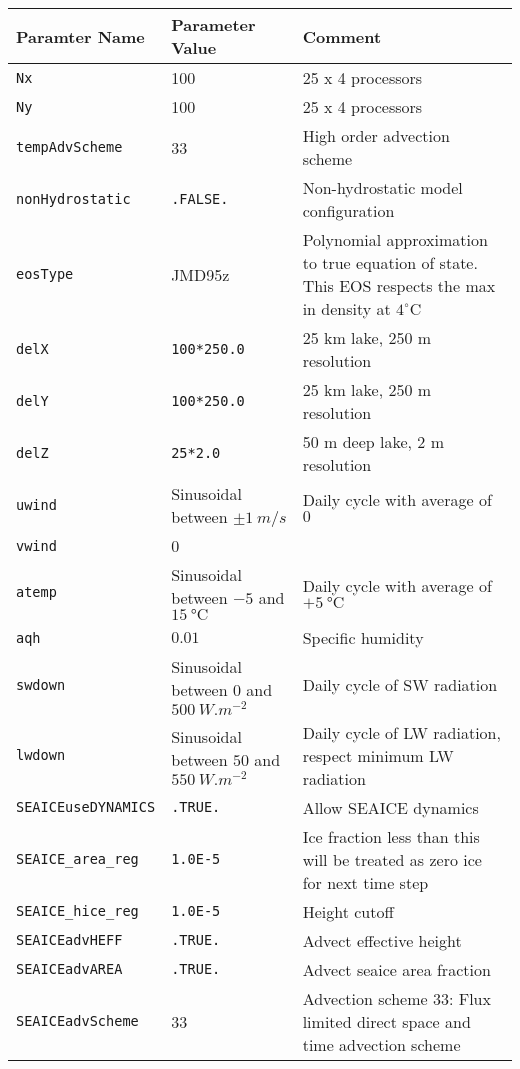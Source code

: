 \documentclass[11pt]{article}
\begin{document}
\begin{longtable}{  p{}  p{}  p{}  }
\hline
\textbf{Paramter Name} & \textbf{Parameter Value} & \textbf{Comment} \\ \hline \hline
\verb|Nx| & 100 & 25 x 4 processors \\ \hline
\verb|Ny| & 100 & 25 x 4 processors \\ \hline
\verb|tempAdvScheme|	&	33	&	High order advection scheme \\ \hline
\verb|nonHydrostatic| & \verb|.FALSE.| & Non-hydrostatic model configuration \\ \hline
\verb|eosType|		&	JMD95z	&	Polynomial approximation to true equation of state. This EOS respects the max in density at $4^{\circ} \textrm{C}$\\ \hline
\verb|delX|			&	\verb|100*250.0|	&	25 km lake, 250 m resolution \\ \hline
\verb|delY|			&	\verb|100*250.0|	&	25 km lake, 250 m resolution \\ \hline
\verb|delZ|			&	\verb|25*2.0|	&	50 m deep lake, 2 m resolution \\ \hline

\verb|uwind|		&	Sinusoidal between $\pm \SI{1}{m/s}$ & Daily cycle with average of $0$  \\ \hline
\verb|vwind| 	& 0	& \\ \hline
\verb|atemp| 	& Sinusoidal between $-5$ and $\SI{15}{\celsius}$ & Daily cycle with average of $+\SI{5}{\celsius}$ \\ \hline
\verb|aqh| 		& $0.01$		&	Specific humidity \\ \hline
\verb|swdown| 	& Sinusoidal between $0$ and $\SI{500}{W.m^{-2}}$	& Daily cycle of SW radiation \\ \hline
\verb|lwdown| 	& Sinusoidal between $50$ and $\SI{550}{W.m^{-2}}$	& Daily cycle of LW radiation, respect minimum LW radiation \\ \hline

\verb|SEAICEuseDYNAMICS| & \verb|.TRUE.| & Allow SEAICE dynamics \\ \hline
\verb|SEAICE_area_reg|   & \verb|1.0E-5| & Ice fraction less than this will be treated as zero ice for next time step \\ \hline
\verb|SEAICE_hice_reg|   & \verb|1.0E-5| & Height cutoff \\ \hline
\verb|SEAICEadvHEFF|     & \verb|.TRUE.| & Advect effective height \\ \hline
\verb|SEAICEadvAREA|     & \verb|.TRUE.| & Advect seaice area fraction \\ \hline
\verb|SEAICEadvScheme|   & 33			& Advection scheme 33: Flux limited direct space and time advection scheme \\ \hline


\end{longtable}
\end{document}
